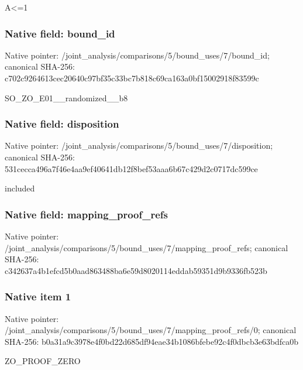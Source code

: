 \documentclass[10pt,a4paper]{article}
\begin{document}
\begingroup\raggedright\sloppy A<=\allowbreak{}1\par\endgroup

\subsubsection{Native field: bound\_\allowbreak{}id}
Native pointer: /joint\_\allowbreak{}analysis/comparisons/5/bound\_\allowbreak{}uses/7/bound\_\allowbreak{}id; canonical SHA-256: c702c9264613cec20640c97bf35c33bc7b818c69ca163a0bf15002918f83599c

\begingroup\raggedright\sloppy SO\_\allowbreak{}ZO\_\allowbreak{}E01\_\allowbreak{}\_\allowbreak{}randomized\_\allowbreak{}\_\allowbreak{}b8\par\endgroup

\subsubsection{Native field: disposition}
Native pointer: /joint\_\allowbreak{}analysis/comparisons/5/bound\_\allowbreak{}uses/7/disposition; canonical SHA-256: 531cecca496a7f46e4aa9ef40641db12f8bef53aaa6b67c429d2c0717dc599ce

\begingroup\raggedright\sloppy included\par\endgroup

\subsubsection{Native field: mapping\_\allowbreak{}proof\_\allowbreak{}refs}
Native pointer: /joint\_\allowbreak{}analysis/comparisons/5/bound\_\allowbreak{}uses/7/mapping\_\allowbreak{}proof\_\allowbreak{}refs; canonical SHA-256: c342637a4b1efcd5b0aad863488ba6e59d8020114eddab59351d9b9336fb523b

\subsubsection{Native item 1}
Native pointer: /joint\_\allowbreak{}analysis/comparisons/5/bound\_\allowbreak{}uses/7/mapping\_\allowbreak{}proof\_\allowbreak{}refs/0; canonical SHA-256: b0a31a9c3978e4f0bd22d685df94eae34b1086bfebe92c4f0dbcb3e63bdfca0b

\begingroup\raggedright\sloppy ZO\_\allowbreak{}PROOF\_\allowbreak{}ZERO\par\endgroup
\end{document}
